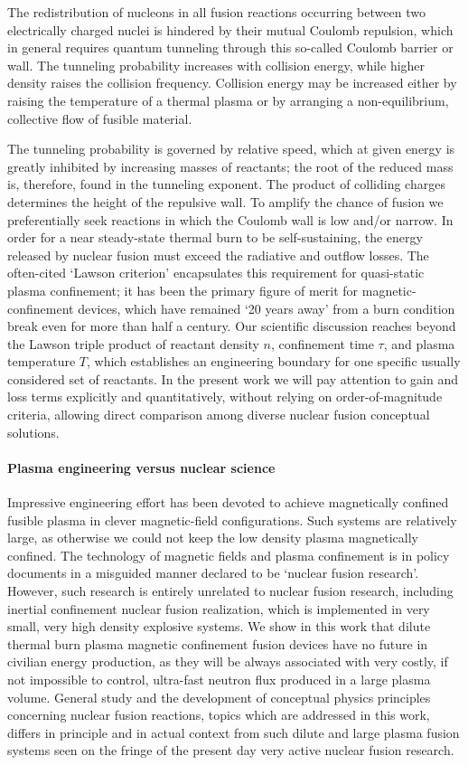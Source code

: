 \documentclass[particles,article,accept,pdftex,moreauthors]{Definitions/mdpi}
\begin{document}
The redistribution of nucleons in all fusion reactions occurring between two electrically charged nuclei is hindered by their mutual Coulomb repulsion, which in general requires quantum tunneling through this so-called Coulomb barrier or wall. The tunneling probability increases with collision energy, while higher density raises the collision frequency. Collision energy may be increased either by raising the temperature of a thermal plasma or by arranging a non-equilibrium, collective flow of fusible material.

The tunneling probability is governed by relative speed, which at given energy is greatly inhibited by increasing masses of reactants; the root of the reduced mass is, therefore, found in the tunneling exponent. The product of colliding charges determines the height of the repulsive wall. To amplify the chance of fusion we preferentially seek reactions in which the Coulomb wall is low and/or narrow. In order for a near steady-state thermal burn to be self-sustaining, the energy released by nuclear fusion must exceed the radiative and outflow losses. The often-cited `Lawson criterion' encapsulates this requirement for quasi-static plasma confinement; it has been the primary figure of merit for magnetic-confinement devices, which have remained `20 years away' from a burn condition break even for more than half a century. Our scientific discussion reaches beyond the Lawson triple product of reactant density $n$, confinement time $\tau$, and plasma temperature $T$, which establishes an engineering boundary for one specific usually considered set of reactants. In the present work we will pay attention to gain and loss terms explicitly and quantitatively, without relying on order-of-magnitude criteria, allowing direct comparison among diverse nuclear fusion conceptual solutions.

\paragraph*{\bf Plasma engineering versus nuclear science}
Impressive engineering effort has been devoted to achieve magnetically confined fusible plasma in clever magnetic-field configurations. Such systems are relatively large, as otherwise we could not keep the low density plasma magnetically confined. The technology of magnetic fields and plasma confinement is in policy documents in a misguided manner declared to be `nuclear fusion research'. However, such research is entirely unrelated to nuclear fusion research, including inertial confinement nuclear fusion realization, which is implemented in very small, very high density explosive systems. We show in this work that dilute thermal burn plasma magnetic confinement fusion devices have no future in civilian energy production, as they will be always associated with very costly, if not impossible to control, ultra-fast neutron flux produced in a large plasma volume. General study and the development of conceptual physics principles concerning nuclear fusion reactions, topics which are addressed in this work, differs in principle and in actual context from such dilute and large plasma fusion systems seen on the fringe of the present day very active nuclear fusion research. 
\end{document}
